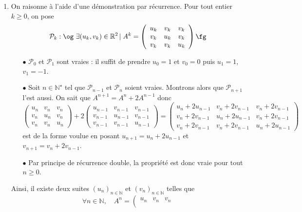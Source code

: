 \documentclass[a4paper,10pt]{report}
\begin{document}
\begin{enumerate}
\item On raisonne à l'aide d'une démonstration par récurrence. Pour tout entier $k \geq 0$, on pose $$ \mathcal{P}_k : \hbox{\og} \  \exists (u_k, v_k) \in \mathbb{R}^2 \, \vert \;  A^k  = \left( {\begin{array}{*{20}{c}}
{{u_k}}&{{v_k}}&{{v_k}}\\
{{v_k}}&{{u_k}}&{{v_k}}\\
{{v_k}}&{{v_k}}&{{u_k}}
\end{array}} \right) \hbox{\fg}$$
\begin{enumerate}
\item [$\bullet$] $\mathcal{P}_0$ et $\mathcal{P}_1$ sont vraies : il suffit de prendre $u_0=1$ et $v_0=0$ puis $u_1 = 1$, $v_1=-1$.
\item [$\bullet$] Soit $n \in \mathbb{N}^\star$ tel que $\mathcal{P}_{n-1}$ et $\mathcal{P}_n$ soient vraies. Montrons alors que $\mathcal{P}_{n+1}$ l'est aussi. On sait que $A^{n+1} = A^n + 2 A^{n-1}$ donc \[\left( {\begin{array}{*{20}{c}}
{{u_n}}&{{v_n}}&{{v_n}}\\
{{v_n}}&{{u_n}}&{{v_n}}\\
{{v_n}}&{{v_n}}&{{u_n}}
\end{array}} \right) + 2\left( {\begin{array}{*{20}{c}}
{{u_{n - 1}}}&{{v_{n - 1}}}&{{v_{n - 1}}}\\
{{v_{n - 1}}}&{{u_{n - 1}}}&{{v_{n - 1}}}\\
{{v_{n - 1}}}&{{v_{n - 1}}}&{{u_{n - 1}}}
\end{array}} \right) = \left( {\begin{array}{*{20}{c}}
{{u_n} + 2{u_{n - 1}}}&{{v_n} + 2{v_{n - 1}}}&{{v_n} + 2{v_{n - 1}}}\\
{{v_n} + 2{v_{n - 1}}}&{{u_n} + 2{u_{n - 1}}}&{{v_n} + 2{v_{n - 1}}}\\
{{v_n} + 2{v_{n - 1}}}&{{v_n} + 2{v_{n - 1}}}&{{u_n} + 2{u_{n - 1}}}
\end{array}} \right)\]
est de la forme voulue en posant $u_{n+1} = u_n + 2 u_{n-1}$ et $v_{n+1}= v_n + 2 v_{n-1}$.
\item [$\bullet$] Par principe de récurrence double, la propriété est donc vraie pour tout $n \geq 0$.
\end{enumerate}
Ainsi, il existe deux suites $\left(u_{n}\right)_{n\in\mathbb{N}}$
et $\left(v_{n}\right)_{n\in\mathbb{N}}$ telles que
\[
\forall n\in\mathbb{N},\quad A^{n}=\left(\begin{array}{ccc}
u_{n} & v_{n} & v_{n}\\

\end{array}\]
\end{enumerate}
\end{document}
